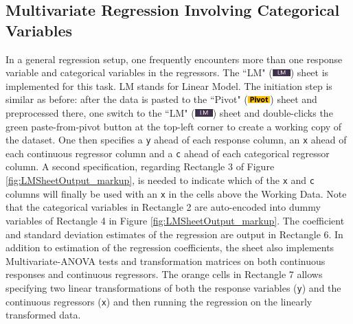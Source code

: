 \documentclass[article]{jss}
\numberwithin{equation}{subsection}
\newcommand{\shtPivot}{``Pivot" (\includegraphics[height=8pt, keepaspectratio=true]{PivotSheetTab_png}) }
\newcommand{\shtLM}{``LM" (\includegraphics[height=8pt, keepaspectratio=true]{LMSheetTab_png}) }
\begin{document}
        \subsection[egLM]{Multivariate Regression Involving Categorical Variables}
        In a general regression setup, one frequently encounters more than one response variable and categorical variables in the regressors. The \shtLM sheet is implemented for this task. LM stands for Linear Model. The initiation step is similar as before: after the data is pasted to the \shtPivot sheet and preprocessed there, one switch to the \shtLM sheet and double-clicks the green paste-from-pivot button at the top-left corner to create a working copy of the dataset. One then specifies a \texttt{y} ahead of each response column, an \texttt{x} ahead of each continuous regressor column and a \texttt{c} ahead of each categorical regressor column. A second specification, regarding Rectangle 3 of Figure \ref{fig:LMSheetOutput_markup}, is needed to indicate which of the \texttt{x} and \texttt{c} columns will finally be used with an \texttt{x} in the cells above the Working Data. Note that the categorical variables in Rectangle 2 are auto-encoded into dummy variables of Rectangle 4 in Figure \ref{fig:LMSheetOutput_markup}. The coefficient and standard deviation estimates of the regression are output in Rectangle 6.
        In addition to estimation of the regression coefficients, the sheet also implements Multivariate-ANOVA tests and transformation matrices on both continuous responses and continuous regressors.
        The orange cells in Rectangle 7 allows specifying two linear transformations of both the response variables (\texttt{y}) and the continuous regressors (\texttt{x}) and then running the regression on the linearly transformed data.
\end{document}

